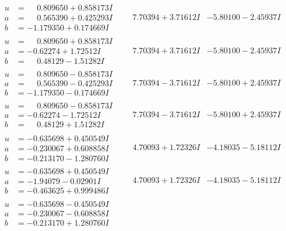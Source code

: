 \documentclass[1p]{elsarticle_modified}
\theoremstyle{definition}
\begin{document}
$$\begin{array}{c|c|c}
\begin{aligned}
u &= \phantom{-}0.809650 + 0.858173 I \\
a &= \phantom{-}0.565390 + 0.425293 I \\
b &= -1.179350 + 0.174669 I\end{aligned}
 & \phantom{-}7.70394 + 3.71612 I & -5.80100 - 2.45937 I \\ \hline\begin{aligned}
u &= \phantom{-}0.809650 + 0.858173 I \\
a &= -0.62274 + 1.72512 I \\
b &= \phantom{-}0.48129 - 1.51282 I\end{aligned}
 & \phantom{-}7.70394 + 3.71612 I & -5.80100 - 2.45937 I \\ \hline\begin{aligned}
u &= \phantom{-}0.809650 - 0.858173 I \\
a &= \phantom{-}0.565390 - 0.425293 I \\
b &= -1.179350 - 0.174669 I\end{aligned}
 & \phantom{-}7.70394 - 3.71612 I & -5.80100 + 2.45937 I \\ \hline\begin{aligned}
u &= \phantom{-}0.809650 - 0.858173 I \\
a &= -0.62274 - 1.72512 I \\
b &= \phantom{-}0.48129 + 1.51282 I\end{aligned}
 & \phantom{-}7.70394 - 3.71612 I & -5.80100 + 2.45937 I \\ \hline\begin{aligned}
u &= -0.635698 + 0.450549 I \\
a &= -0.230067 + 0.608858 I \\
b &= -0.213170 - 1.280760 I\end{aligned}
 & \phantom{-}4.70093 + 1.72326 I & -4.18035 - 5.18112 I \\ \hline\begin{aligned}
u &= -0.635698 + 0.450549 I \\
a &= -1.94079 - 0.02901 I \\
b &= -0.463625 + 0.999486 I\end{aligned}
 & \phantom{-}4.70093 + 1.72326 I & -4.18035 - 5.18112 I \\ \hline\begin{aligned}
u &= -0.635698 - 0.450549 I \\
a &= -0.230067 - 0.608858 I \\
b &= -0.213170 + 1.280760 I\end{aligned}

\end{array}$$
\end{document}
